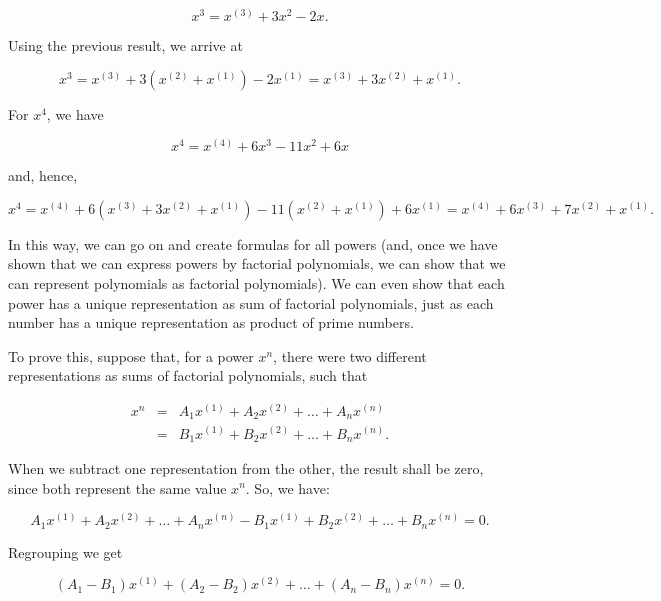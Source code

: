 \documentclass[tikz]{scrreprt}
\begin{document}
\begin{equation}
x^3 = x^{(3)} + 3x^2 - 2x.
\end{equation}

Using the previous result, we arrive at

\begin{equation}
x^3 = x^{(3)} + 3(x^{(2)} + x^{(1)}) - 2x^{(1)} =
      x^{(3)} + 3x^{(2)} + x^{(1)}.
\end{equation}

For $x^4$, we have

\begin{equation}
x^4 = x^{(4)} + 6x^3 - 11x^2 + 6x 
\end{equation}

and, hence,

\begin{equation}
x^4 = 
x^{(4)} + 6(x^{(3)} + 3x^{(2)} + x^{(1)}) - 11(x^{(2)} + x^{(1)}) + 6x^{(1)} =
x^{(4)} + 6x^{(3)} + 7x^{(2)} + x^{(1)}.
\end{equation}

In this way, we can go on and create formulas for all powers
(and, once we have shown that we can express powers by
factorial polynomials, we can show that we can represent
polynomials as factorial polynomials).
We can even show that each power has a unique representation
as sum of factorial polynomials, just as each number
has a unique representation as product of prime numbers.

To prove this, suppose that, for a power $x^n$,
there were two different representations as sums of
factorial polynomials, such that

\begin{align}
x^n & = & A_1x^{(1)} + A_2x^{(2)} + \dots + A_nx^{(n)}\\
    & = & B_1x^{(1)} + B_2x^{(2)} + \dots + B_nx^{(n)}.
\end{align}

When we subtract one representation from the other,
the result shall be zero, since both represent the
same value $x^n$. So, we have:

\begin{equation}
A_1x^{(1)} + A_2x^{(2)} + \dots + A_nx^{(n)} -
B_1x^{(1)} + B_2x^{(2)} + \dots + B_nx^{(n)} = 0.
\end{equation}

Regrouping we get

\begin{equation}
(A_1-B_1)x^{(1)} + (A_2-B_2)x^{(2)} + \dots + (A_n-B_n)x^{(n)} = 0.
\end{equation}
\end{document}
